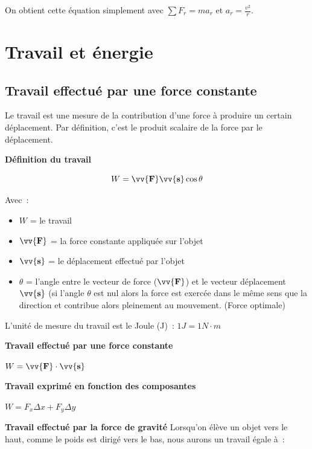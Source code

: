 \documentclass{article}
\begin{document}
On obtient cette équation simplement avec $\sum F_r = ma_r$ et $a_r = \frac{v^2}{r}$. 

\section{Travail et énergie}
\subsection{Travail effectué par une force constante}
Le travail est une mesure de la contribution d'une force à produire un certain déplacement. Par définition, c'est le produit scalaire de la force par le déplacement.
\newline

\noindent
\textbf{Définition du travail}
\newline

\[W = \vv{\mathbf{F}}\vv{\mathbf{s}}\cos{\theta}\]
\newline

Avec :
\begin{itemize}
    \item $W$ = le travail
    \item $\vv{\mathbf{F}}$ = la force constante appliquée sur l'objet
    \item $\vv{\mathbf{s}}$ = le déplacement effectué par l'objet
    \item $\theta$ = l'angle entre le vecteur de force ($\vv{\mathbf{F}}$) et le vecteur déplacement $\vv{\mathbf{s}}$ (si l'angle $\theta$ est nul alors la force est exercée dans le même sens que la direction et contribue alors pleinement au mouvement. (Force optimale)
\end{itemize}

L'unité de mesure du travail est le Joule (J) : $1J = 1N\cdot m$
\newline

\noindent
\textbf{Travail effectué par une force constante}
\newline

$W = \vv{\mathbf{F}}\cdot \vv{\mathbf{s}}$
\newline

\noindent
\textbf{Travail exprimé en fonction des composantes}
\newline

$W = F_x\Delta x + F_y\Delta y$
\newline

\noindent
\textbf{Travail effectué  par la force de gravité}
\newline
Lorsqu'on élève un objet vers le haut, comme le poids est dirigé vers le bas, nous aurons un travail égale à :
\newline
\end{document}
